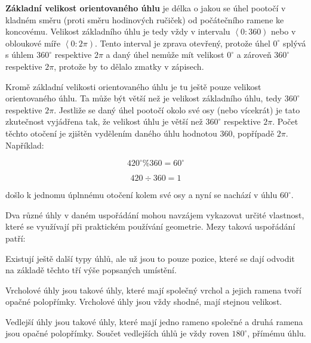 {\bf Základní velikost orientovaného úhlu} je délka o jakou se úhel pootočí v kladném směru (proti směru hodinových ručiček) od počátečního ramene ke koncovému. Velikost základního úhlu je tedy vždy v intervalu $\left< 0:360 \right)$ nebo v obloukové míře $ \left<0 : 2\pi\right)$. Tento interval je zprava otevřený, protože úhel $0^\circ$ splývá s úhlem $360^\circ$ respektive $2\pi$ a daný úhel nemůže mít velikost $0^\circ$ a zároveň $360^\circ$ respektive $2\pi$, protože by to dělalo zmatky v zápisech. 

Kromě základní velikosti orientovaného úhlu je tu ještě pouze velikost orientovaného úhlu. Ta může být větší než je velikost základního úhlu, tedy $360^\circ$ respektive $2\pi$. Jestliže se daný úhel pootočí okolo své osy (nebo vícekrát) je tato zkutečnost vyjádřena tak, že velikost úhlu je větší než $360^\circ$ respektive $2\pi$. Počet těchto otočení je zjištěn vydělením daného úhlu hodnotou 360, popřípadě $2\pi$. Například:

$$ 420^\circ \% 360 = 60^\circ$$

$$ 420 \div 360 = 1 $$ 

došlo k jednomu úplnnému otočení kolem své osy a nyní se nachází v úhlu $60^\circ$. 


Dva různé úhly v daném uspořádání mohou navzájem vykazovat určité vlastnost, které se využívají při praktickém používání geometrie. Mezy taková uspořádání patří:

\vskip 4mm
\vskip 4mm

Existují ještě další typy úhlů, ale už jsou to pouze pozice, které se dají odvodit na základě těchto tří výše popsaných umístění.


Vrcholové úhly jsou takové úhly, které mají společný vrchol a jejich ramena tvoří opačné polopřímky. Vrcholové úhly jsou vždy shodné, mají stejnou velikost.

\vskip 4mm
\centerline{}
\vskip 4mm


Vedlejší úhly jsou takové úhly, které mají jedno rameno společné a druhá ramena jsou opačné polopřímky. Součet vedlejších úhlů je vždy roven $180^\circ$, přímému úhlu.

\vskip 4mm
\centerline{}
\vskip 4mm



